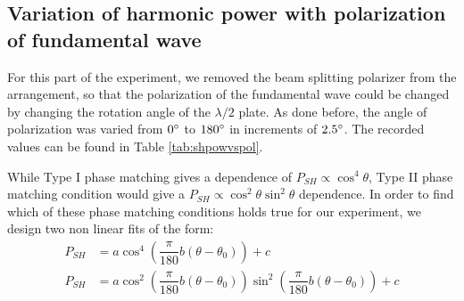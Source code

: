 \subsection{Variation of harmonic power with polarization of fundamental wave}
For this part of the experiment, we removed the beam splitting polarizer from the arrangement, so that the polarization of the fundamental wave could be changed by changing the rotation angle of the $\lambda/2$ plate. As done before, the angle of polarization was varied from $0 \degree$ to $180 \degree$ in increments of $2.5 \degree$. The recorded values can be found in Table \ref{tab:shpowvspol}. 

While Type I phase matching gives a dependence of $P_{SH}\propto \cos^{4}\theta$, Type II phase matching condition would give a $P_{SH}\propto \cos^{2}\theta\sin^{2}\theta$ dependence. In order to find which of these phase matching conditions holds true for our experiment, we design two non linear fits of the form:
\begin{align}
P_{SH}&=a\cos^{4}\left(\dfrac{\pi}{180}b(\theta-\theta_{0})\right)+c\\
P_{SH}&=a\cos^{2}\left(\dfrac{\pi}{180}b(\theta-\theta_{0})\right)\sin^{2}\left(\dfrac{\pi}{180}b(\theta-\theta_{0})\right)+c
\end{align}